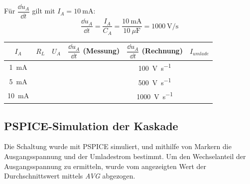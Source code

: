 \documentclass[
12pt,
a4paper,
bibliography=totoc,
listof=totoc,
headings=small,
parskip=half*, %
]{scrartcl}
\renewcommand{\arraystretch}{1.15}
\newcommand{\laborsubsection}[2] {
	\renewcommand{\thesubsection}{#1 \thesection.\arabic{subsection}}
	\subsection{#2}
	\renewcommand{\thesubsection}{\thesection.\arabic{subsection}}
}
\newcommand{\resetlaborsectioncounter}{\setcounter{subsection}{0}}
\begin{document}
Für $\dfrac{\dd{u_A}}{\dd{t}}$ gilt mit $I_A = \SI{10}{\milli\ampere}$:
\begin{equation}
	\dfrac{\dd{u_A}}{\dd{t}} = \dfrac{I_A}{C_A} = \dfrac{\SI{10}{\milli\ampere}}{\SI{10}{\mu\farad}} = \SI{1000}{\volt\per\second}
\end{equation}

\begin{table}[H]
	\centering
	\renewcommand{\arraystretch}{2} %
	\setlength{\tabcolsep}{1.3em} %
	\begin{tabular}{|c|c|c|c|c|c|}
		\hline
		$I_A$                  & $R_L $ & $U_A$ & $\dfrac{\dd{u_A}}{\dd{t}}$ (Messung) & $\dfrac{\dd{u_A}}{\dd{t}}$ (Rechnung) & $I_{umlade}$ \\ \hline
		\SI{1}{\milli\ampere}  &        &       &                                      & \SI{100}{\volt\per\second}            &              \\ \hline
		\SI{5}{\milli\ampere}  &        &       &                                      & \SI{500}{\volt\per\second}            &              \\ \hline
		\SI{10}{\milli\ampere} &        &       &                                      & \SI{1000}{\volt\per\second}           &              \\ \hline
	\end{tabular}
\end{table}

\resetlaborsectioncounter
\laborsubsection{D}{PSPICE-Simulation der Kaskade}
Die Schaltung wurde mit PSPICE simuliert, und mithilfe von Markern die Ausgangsspannung und der Umladestrom bestimmt. Um den Wechselanteil der Ausgangsspannung zu ermitteln, wurde vom angezeigten Wert der Durchschnittswert mittels \textit{AVG} abgezogen.
\end{document}
